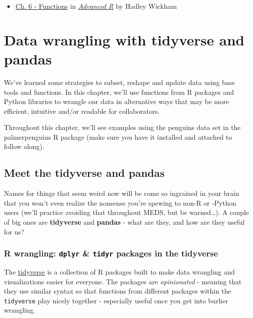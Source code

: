 \documentclass[
]{book}
\providecommand{\tightlist}{%
  \setlength{\itemsep}{0pt}\setlength{\parskip}{0pt}}
\begin{document}
\begin{itemize}
\tightlist
\item
  \href{https://adv-r.hadley.nz/functions.html}{Ch. 6 - Functions} in \href{https://adv-r.hadley.nz/}{\emph{Advanced R}} by Hadley Wickham
\end{itemize}

\hypertarget{wrangling}{%
\chapter{Data wrangling with tidyverse and pandas}\label{wrangling}}

We've learned some strategies to subset, reshape and update data using base tools and functions. In this chapter, we'll use functions from R packages and Python libraries to wrangle our data in alternative ways that may be more efficient, intuitive and/or readable for collaborators.

Throughout this chapter, we'll see examples using the penguins data set in the palmerpenguins R package (make sure you have it installed and attached to follow along).

\hypertarget{meet-the-tidyverse-and-pandas}{%
\section{Meet the tidyverse and pandas}\label{meet-the-tidyverse-and-pandas}}

Names for things that seem weird now will be come so ingrained in your brain that you won't even realize the nonsense you're spewing to non-R or -Python users (we'll practice avoiding that throughout MEDS, but be warned\ldots). A couple of big ones are \textbf{tidyverse} and \textbf{pandas} - what are they, and how are they useful for us?

\hypertarget{r-wrangling-dplyr-tidyr-packages-in-the-tidyverse}{%
\subsection{\texorpdfstring{R wrangling: \texttt{dplyr} \& \texttt{tidyr} packages in the tidyverse}{R wrangling: dplyr \& tidyr packages in the tidyverse}}\label{r-wrangling-dplyr-tidyr-packages-in-the-tidyverse}}

The \href{https://www.tidyverse.org/}{tidyverse} is a collection of R packages built to make data wrangling and visualizations easier for everyone. The packages are \emph{opinionated} - meaning that they use similar syntax so that functions from different packages within the \texttt{tidyverse} play nicely together - especially useful once you get into burlier wrangling.
\end{document}
